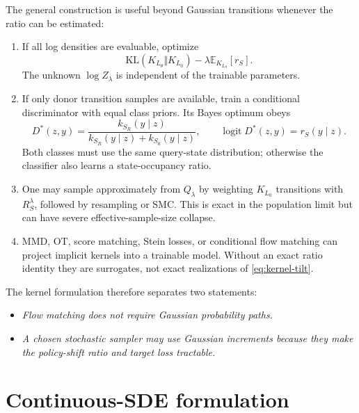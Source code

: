 \documentclass[11pt,a4paper]{article}
\newcommand{\E}{\mathbb{E}}
\newcommand{\KL}{\mathrm{KL}}
\newcommand{\Sbase}{S_0}
\newcommand{\Srl}{S_R}
\newcommand{\Lbase}{L_0}
\newcommand{\Lactor}{L_\theta}
\theoremstyle{plain}
\theoremstyle{definition}
\begin{document}
The general construction is useful beyond Gaussian transitions whenever the ratio can be
estimated:
\begin{enumerate}[leftmargin=1.6em]
\item If all log densities are evaluable, optimize
      \begin{equation}
      \KL(K_{\Lactor}\Vert K_{\Lbase})
      -\lambda\E_{K_{\Lactor}}[r_S].
      \label{eq:implicit-kernel-loss}
      \end{equation}
      The unknown $\log Z_\lambda$ is independent of the trainable parameters.
\item If only donor transition samples are available, train a conditional discriminator with
      equal class priors.  Its Bayes optimum obeys
      \begin{equation}
      D^*(z,y)
      =
      \frac{k_{\Srl}(y\mid z)}
           {k_{\Srl}(y\mid z)+k_{\Sbase}(y\mid z)},
      \qquad
      \operatorname{logit}D^*(z,y)=r_S(y\mid z).
      \label{eq:ratio-classifier}
      \end{equation}
      Both classes must use the same query-state distribution; otherwise the classifier also
      learns a state-occupancy ratio.
\item One may sample approximately from $Q_\lambda$ by weighting
      $K_{\Lbase}$ transitions with $R_S^\lambda$, followed by resampling or SMC.  This is exact
      in the population limit but can have severe effective-sample-size collapse.
\item MMD, OT, score matching, Stein losses, or conditional flow matching can project implicit
      kernels into a trainable model.  Without an exact ratio identity they are surrogates, not
      exact realizations of \eqref{eq:kernel-tilt}.
\end{enumerate}

The kernel formulation therefore separates two statements:
\begin{itemize}[leftmargin=1.6em]
\item \emph{Flow matching does not require Gaussian probability paths.}
\item \emph{A chosen stochastic sampler may use Gaussian increments because they make the
      policy-shift ratio and target loss tractable.}
\end{itemize}

\section{Continuous-SDE formulation}
\label{sec:sde}
\end{document}
